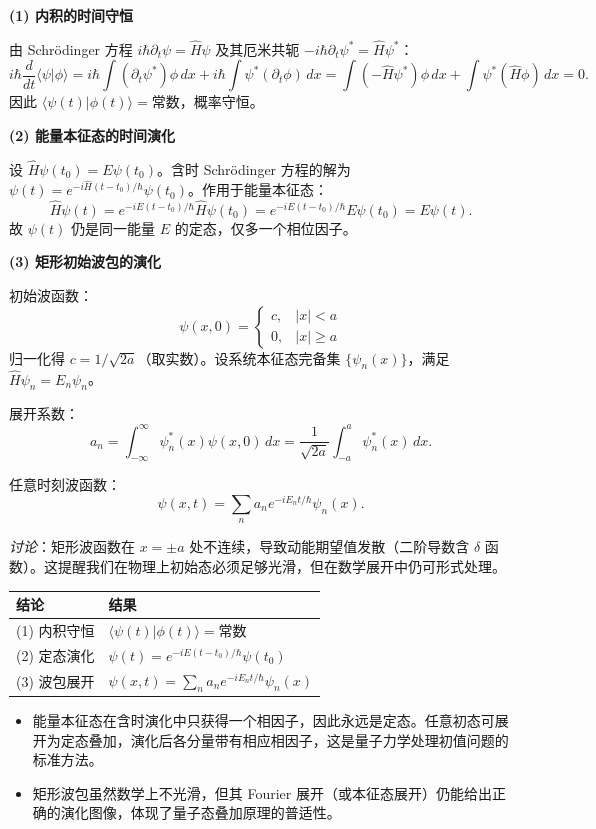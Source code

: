 \begin{derivationbox}[标准解题过程]
\textbf{(1) 内积的时间守恒}

由 Schrödinger 方程 $i\hbar\partial_t\psi=\hat H\psi$ 及其厄米共轭 $-i\hbar\partial_t\psi^*=\hat H\psi^*$：
\[
i\hbar\frac{d}{dt}\langle\psi|\phi\rangle=i\hbar\int(\partial_t\psi^*)\phi\,dx+i\hbar\int\psi^*(\partial_t\phi)\,dx=\int(-\hat H\psi^*)\phi\,dx+\int\psi^*(\hat H\phi)\,dx=0.
\]
因此 $\langle\psi(t)|\phi(t)\rangle=\text{常数}$，概率守恒。

\textbf{(2) 能量本征态的时间演化}

设 $\hat H\psi(t_0)=E\psi(t_0)$。含时 Schrödinger 方程的解为 $\psi(t)=e^{-i\hat H(t-t_0)/\hbar}\psi(t_0)$。作用于能量本征态：
\[
\hat H\psi(t)=e^{-iE(t-t_0)/\hbar}\hat H\psi(t_0)=e^{-iE(t-t_0)/\hbar}E\psi(t_0)=E\psi(t).
\]
故 $\psi(t)$ 仍是同一能量 $E$ 的定态，仅多一个相位因子。

\textbf{(3) 矩形初始波包的演化}

初始波函数：
\[
\psi(x,0)=\begin{cases}c,&|x|<a\\0,&|x|\geq a\end{cases}
\]
归一化得 $c=1/\sqrt{2a}$（取实数）。设系统本征态完备集 $\{\psi_n(x)\}$，满足 $\hat H\psi_n=E_n\psi_n$。

展开系数：
\[
a_n=\int_{-\infty}^{\infty}\psi_n^*(x)\psi(x,0)\,dx=\frac{1}{\sqrt{2a}}\int_{-a}^{a}\psi_n^*(x)\,dx.
\]

任意时刻波函数：
\begin{equation}
\boxed{\psi(x,t)=\sum_n a_n e^{-iE_nt/\hbar}\psi_n(x).}
\end{equation}

\textit{讨论}：矩形波函数在 $x=\pm a$ 处不连续，导致动能期望值发散（二阶导数含 $\delta$ 函数）。这提醒我们在物理上初始态必须足够光滑，但在数学展开中仍可形式处理。
\end{derivationbox}

\begin{formulabox}[答案汇总]
\begin{center}
\begin{tabular}{ll}
\toprule
\textbf{结论} & \textbf{结果} \\
\midrule
(1) 内积守恒 & $\langle\psi(t)|\phi(t)\rangle=\text{常数}$ \\
(2) 定态演化 & $\psi(t)=e^{-iE(t-t_0)/\hbar}\psi(t_0)$ \\
(3) 波包展开 & $\psi(x,t)=\sum_n a_n e^{-iE_nt/\hbar}\psi_n(x)$ \\
\bottomrule
\end{tabular}
\end{center}
\end{formulabox}

\begin{insightbox}[物理图像]
\begin{itemize}
    \item 能量本征态在含时演化中只获得一个相因子，因此永远是定态。任意初态可展开为定态叠加，演化后各分量带有相应相因子，这是量子力学处理初值问题的标准方法。
    \item 矩形波包虽然数学上不光滑，但其 Fourier 展开（或本征态展开）仍能给出正确的演化图像，体现了量子态叠加原理的普适性。
\end{itemize}
\end{insightbox}
